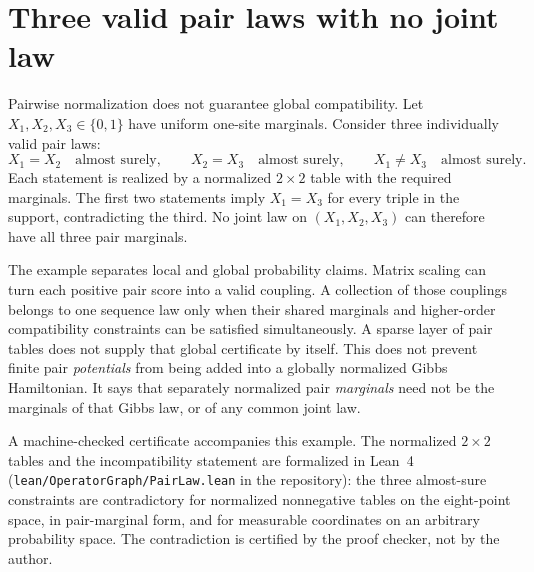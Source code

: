 \section*{Three valid pair laws with no joint law}

Pairwise normalization does not guarantee global compatibility.  Let
$X_1,X_2,X_3\in\{0,1\}$ have uniform one-site marginals.  Consider three individually valid pair
laws:
\begin{equation}
X_1=X_2\quad\text{almost surely},
\qquad
X_2=X_3\quad\text{almost surely},
\qquad
X_1\ne X_3\quad\text{almost surely}.
\label{eq:book-incompatible-pair-laws}
\end{equation}
Each statement is realized by a normalized $2\times2$ table with the required marginals.  The first
two statements imply $X_1=X_3$ for every triple in the support, contradicting the third.  No joint
law on $(X_1,X_2,X_3)$ can therefore have all three pair marginals.

The example separates local and global probability claims.  Matrix scaling can turn each positive
pair score into a valid coupling.  A collection of those couplings belongs to one sequence law only
when their shared marginals and higher-order compatibility constraints can be satisfied
simultaneously.  A sparse layer of pair tables does not supply that global certificate by itself.
This does not prevent finite pair \emph{potentials} from being added into a globally normalized
Gibbs Hamiltonian.  It says that separately normalized pair \emph{marginals} need not be the
marginals of that Gibbs law, or of any common joint law.

A machine-checked certificate accompanies this example.  The normalized $2\times2$ tables and the
incompatibility statement are formalized in Lean~4
(\texttt{lean/OperatorGraph/PairLaw.lean} in the repository): the three almost-sure constraints
are contradictory for normalized nonnegative tables on the eight-point space, in pair-marginal
form, and for measurable coordinates on an arbitrary probability space.  The contradiction is
certified by the proof checker, not by the author.
